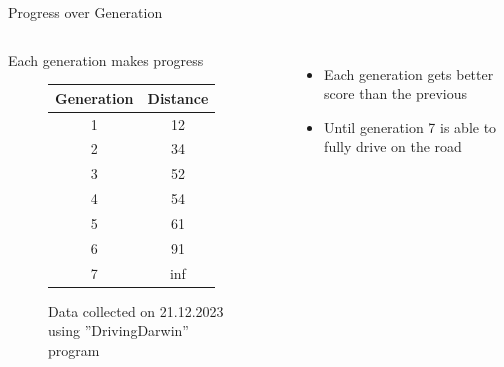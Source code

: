 \documentclass{beamer}
\begin{document}
\begin{frame}{Progress over Generation}
    \begin{columns}
        \column{.6\textheight}
        \begin{exampleblock}{Each generation makes progress}
            \centering
         \begin{figure}
            
            \begin{tabular}{c | c}
                Generation & Distance \\
                \hline
                1  & 12\\
                \hline
                2  & 34\\
                \hline
                3  & 52\\
                \hline
                4  & 54\\
                \hline
                5 & 61\\
                \hline
                6 & 91\\
                \hline
                7 & inf\\
            \end{tabular}
        \caption{\tiny{Data collected on 21.12.2023 using ”DrivingDarwin” program}}
        \end{figure}
        \end{exampleblock}
        \column{.4\textheight}
        \begin{itemize}
            \item \footnotesize{Each generation gets better score than the previous}
            \item \footnotesize{Until generation 7 is able to fully drive on the road}
        \end{itemize}
        
  
        
    \end{columns}
\end{frame}
\end{document}
